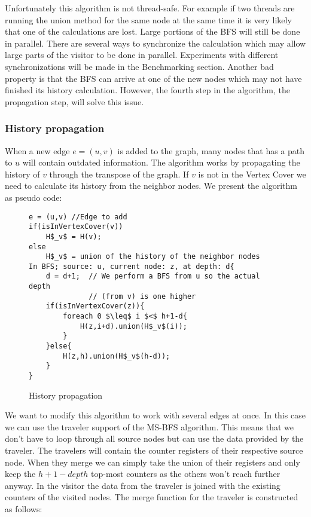 Unfortunately this algorithm is not thread-safe. For example if two threads are running the union method for the same node at the same time it is very likely that one of the calculations are lost. Large portions of the BFS will still be done in parallel. There are several ways to synchronize the calculation which may allow large parts of the visitor to be done in parallel. Experiments with different synchronizations will be made in the Benchmarking section. Another bad property is that the BFS can arrive at one of the new nodes which may not have finished its history calculation. However, the fourth step in the algorithm, the propagation step, will solve this issue. 

\subsubsection{History propagation}

When a new edge $e = (u,v)$ is added to the graph, many nodes that has a path to $u$ will contain outdated information. The algorithm works by propagating the history of $v$ through the transpose of the graph. If $v$ is not in the Vertex Cover we need to calculate its history from the neighbor nodes. We present the algorithm as pseudo code:

\begin{figure}[h]
    \begin{lstlisting}[mathescape]
e = (u,v) //Edge to add
if(isInVertexCover(v))
    H$_v$ = H(v);
else
    H$_v$ = union of the history of the neighbor nodes
In BFS; source: u, current node: z, at depth: d{
    d = d+1;  // We perform a BFS from u so the actual depth 
              // (from v) is one higher
    if(isInVertexCover(z)){
        foreach 0 $\leq$ i $<$ h+1-d{
            H(z,i+d).union(H$_v$(i));
        }
    }else{
        H(z,h).union(H$_v$(h-d));
    }
}
    \end{lstlisting}
    \caption{History propagation}
    \label{fig:history_propagation_algorithm}
\end{figure}

We want to modify this algorithm to work with several edges at once. In this case we can use the traveler support of the MS-BFS algorithm. This means that we don't have to loop through all source nodes but can use the data provided by the traveler. The travelers will contain the counter registers of their respective source node. When they merge we can simply take the union of their registers and only keep the $h+1-depth$ top-most counters as the others won't reach further anyway. In the visitor the data from the traveler is joined with the existing counters of the visited nodes. The merge function for the traveler is constructed as follows:

